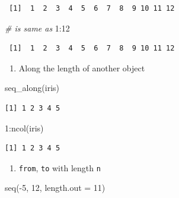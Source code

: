 \documentclass[
]{book}
\newenvironment{Shaded}{\begin{snugshade}}{\end{snugshade}}
\newcommand{\AttributeTok}[1]{\textcolor[rgb]{0.77,0.63,0.00}{#1}}
\newcommand{\CommentTok}[1]{\textcolor[rgb]{0.56,0.35,0.01}{\textit{#1}}}
\newcommand{\DecValTok}[1]{\textcolor[rgb]{0.00,0.00,0.81}{#1}}
\newcommand{\FunctionTok}[1]{\textcolor[rgb]{0.00,0.00,0.00}{#1}}
\newcommand{\NormalTok}[1]{#1}
\newcommand{\SpecialCharTok}[1]{\textcolor[rgb]{0.00,0.00,0.00}{#1}}
\providecommand{\tightlist}{%
  \setlength{\itemsep}{0pt}\setlength{\parskip}{0pt}}
\begin{document}
\begin{verbatim}
 [1]  1  2  3  4  5  6  7  8  9 10 11 12
\end{verbatim}

\begin{Shaded}
\begin{Highlighting}[]
\CommentTok{\# is same as}
\DecValTok{1}\SpecialCharTok{:}\DecValTok{12}
\end{Highlighting}
\end{Shaded}

\begin{verbatim}
 [1]  1  2  3  4  5  6  7  8  9 10 11 12
\end{verbatim}

\begin{enumerate}
\def\labelenumi{\arabic{enumi}.}
\setcounter{enumi}{2}
\tightlist
\item
  Along the length of another object
\end{enumerate}

\begin{Shaded}
\begin{Highlighting}[]
\FunctionTok{seq\_along}\NormalTok{(iris)}
\end{Highlighting}
\end{Shaded}

\begin{verbatim}
[1] 1 2 3 4 5
\end{verbatim}

\begin{Shaded}
\begin{Highlighting}[]
\DecValTok{1}\SpecialCharTok{:}\FunctionTok{ncol}\NormalTok{(iris)}
\end{Highlighting}
\end{Shaded}

\begin{verbatim}
[1] 1 2 3 4 5
\end{verbatim}

\begin{enumerate}
\def\labelenumi{\arabic{enumi}.}
\setcounter{enumi}{3}
\tightlist
\item
  \texttt{from}, \texttt{to} with length \texttt{n}
\end{enumerate}

\begin{Shaded}
\begin{Highlighting}[]
\FunctionTok{seq}\NormalTok{(}\SpecialCharTok{{-}}\DecValTok{5}\NormalTok{, }\DecValTok{12}\NormalTok{, }\AttributeTok{length.out =} \DecValTok{11}\NormalTok{)}
\end{Highlighting}
\end{Shaded}
\end{document}
